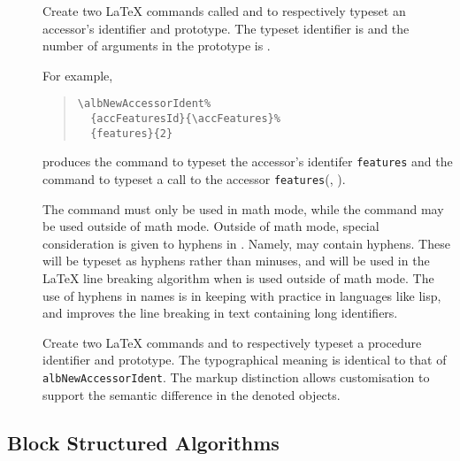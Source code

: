 \documentclass[11pt,a4paper,oneside,titlepage]{alb-latex}
\begin{document}
\begin{description}
\item[%
  ] Create two \LaTeX{} commands called  and
   to respectively typeset an accessor's identifier
  and prototype.  The typeset identifier is  and the
  number of arguments in the prototype is .

  For example,
  \begin{quote}
\begin{verbatim}
\albNewAccessorIdent%
  {accFeaturesId}{\accFeatures}%
  {features}{2}
\end{verbatim}
  \end{quote}
  produces the command  to typeset the
  accessor's identifer \texttt{features} and the command
   to typeset a
  call to the accessor \texttt{features}(,
  ).

  The  command must only be used in math mode, while
  the  command may be used outside of math mode.
  Outside of math mode, special consideration is given to hyphens in
  .  Namely,  may contain hyphens.
  These will be typeset as hyphens rather than minuses, and will be used
  in the \LaTeX{} line breaking algorithm when  is
  used outside of math mode.  The use of hyphens in names is in keeping
  with practice in languages like lisp, and improves the line breaking
  in text containing long identifiers.

\item[%
  ] Create two \LaTeX{} commands  and
   to respectively typeset a procedure identifier and
  prototype.  The typographical meaning is identical to that of
  \texttt{albNewAccessorIdent}.  The markup distinction allows \AUCTeX{}
  customisation to support the semantic difference in the denoted
  objects.
\end{description}



\subsection{Block Structured Algorithms}
\label{sec:alb-algorithms-documentation:block-struct-algor}
\end{document}
